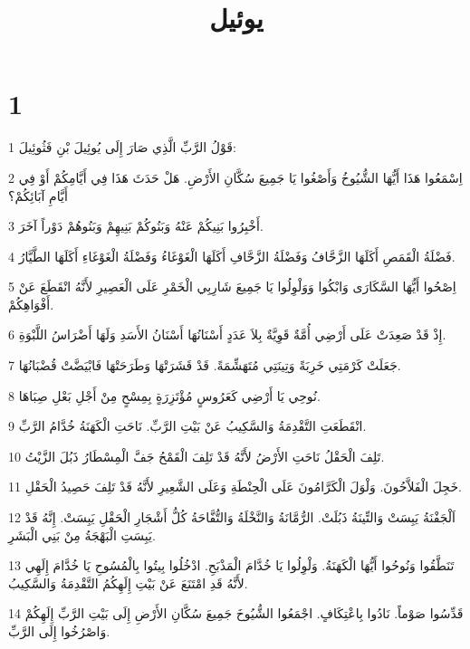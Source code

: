 

\title{يوئيل}


\chapter{1}

\par 1 قَوْلُ الرَّبِّ الَّذِي صَارَ إِلَى يُوئِيلَ بْنِ فَثُوئِيلَ:
\par 2 اِسْمَعُوا هَذَا أَيُّهَا الشُّيُوخُ وَأَصْغُوا يَا جَمِيعَ سُكَّانِ الأَرْضِ. هَلْ حَدَثَ هَذَا فِي أَيَّامِكُمْ أَوْ فِي أَيَّامِ آبَائِكُمْ؟
\par 3 أَخْبِرُوا بَنِيكُمْ عَنْهُ وَبَنُوكُمْ بَنِيهِمْ وَبَنُوهُمْ دَوْراً آخَرَ.
\par 4 فَضْلَةُ الْقَمَصِ أَكَلَهَا الزَّحَّافُ وَفَضْلَةُ الزَّحَّافِ أَكَلَهَا الْغَوْغَاءُ وَفَضْلَةُ الْغَوْغَاءِ أَكَلَهَا الطَّيَّارُ.
\par 5 اِصْحُوا أَيُّهَا السَّكَارَى وَابْكُوا وَوَلْوِلُوا يَا جَمِيعَ شَارِبِي الْخَمْرِ عَلَى الْعَصِيرِ لأَنَّهُ انْقَطَعَ عَنْ أَفْوَاهِكُمْ.
\par 6 إِذْ قَدْ صَعِدَتْ عَلَى أَرْضِي أُمَّةٌ قَوِيَّةٌ بِلاَ عَدَدٍ أَسْنَانُهَا أَسْنَانُ الأَسَدِ وَلَهَا أَضْرَاسُ اللَّبْوَةِ.
\par 7 جَعَلَتْ كَرْمَتِي خَرِبَةً وَتِينَتِي مُتَهَشِّمَةً. قَدْ قَشَرَتْهَا وَطَرَحَتْهَا فَابْيَضَّتْ قُضْبَانُهَا.
\par 8 نُوحِي يَا أَرْضِي كَعَرُوسٍ مُؤْتَزِرَةٍ بِمِسْحٍ مِنْ أَجْلِ بَعْلِ صِبَاهَا.
\par 9 انْقَطَعَتِ التَّقْدِمَةُ وَالسَّكِيبُ عَنْ بَيْتِ الرَّبِّ. نَاحَتِ الْكَهَنَةُ خُدَّامُ الرَّبِّ.
\par 10 تَلِفَ الْحَقْلُ نَاحَتِ الأَرْضُ لأَنَّهُ قَدْ تَلِفَ الْقَمْحُ جَفَّ الْمِسْطَارُ ذَبُلَ الزَّيْتُ.
\par 11 خَجِلَ الْفَلاَّحُونَ. وَلْوَلَ الْكَرَّامُونَ عَلَى الْحِنْطَةِ وَعَلَى الشَّعِيرِ لأَنَّهُ قَدْ تَلِفَ حَصِيدُ الْحَقْلِ.
\par 12 اَلْجَفْنَةُ يَبِسَتْ وَالتِّينَةُ ذَبُلَتْ. الرُّمَّانَةُ وَالنَّخْلَةُ وَالتُّفَّاحَةُ كُلُّ أَشْجَارِ الْحَقْلِ يَبِسَتْ. إِنَّهُ قَدْ يَبِسَتِ الْبَهْجَةُ مِنْ بَنِي الْبَشَرِ.
\par 13 تَنَطَّقُوا وَنُوحُوا أَيُّهَا الْكَهَنَةُ. وَلْوِلُوا يَا خُدَّامَ الْمَذْبَحِ. ادْخُلُوا بِيتُوا بِالْمُسُوحِ يَا خُدَّامَ إِلَهِي لأَنَّهُ قَدِ امْتَنَعَ عَنْ بَيْتِ إِلَهِكُمُ التَّقْدِمَةُ وَالسَّكِيبُ.
\par 14 قَدِّسُوا صَوْماً. نَادُوا بِاعْتِكَافٍ. اجْمَعُوا الشُّيُوخَ جَمِيعَ سُكَّانِ الأَرْضِ إِلَى بَيْتِ الرَّبِّ إِلَهِكُمْ وَاصْرُخُوا إِلَى الرَّبِّ.
